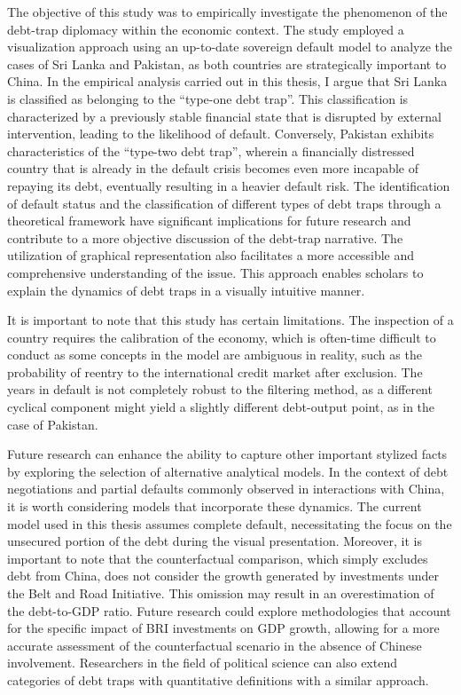 The objective of this study was to empirically investigate the phenomenon of the debt-trap diplomacy within the economic context. The study employed a visualization approach using an up-to-date sovereign default model to analyze the cases of Sri Lanka and Pakistan, as both countries are strategically important to China.
In the empirical analysis carried out in this thesis, I argue that Sri Lanka is classified as belonging to the ``type-one debt trap''. This classification is characterized by a previously stable financial state that is disrupted by external intervention, leading to the likelihood of default. Conversely, Pakistan exhibits characteristics of the ``type-two debt trap'', wherein a financially distressed country that is already in the default crisis becomes even more incapable of repaying its debt, eventually resulting in a heavier default risk.
The identification of default status and the classification of different types of debt traps through a theoretical framework have significant implications for future research and contribute to a more objective discussion of the debt-trap narrative. The utilization of graphical representation also facilitates a more accessible and comprehensive understanding of the issue. This approach enables scholars to explain the dynamics of debt traps in a visually intuitive manner.

It is important to note that this study has certain limitations. The inspection of a country requires the calibration of the economy, which is often-time difficult to conduct as some concepts in the model are ambiguous in reality, such as the probability of reentry to the international credit market after exclusion. The years in default is not completely robust to the filtering method, as a different cyclical component might yield a slightly different debt-output point, as in the case of Pakistan.

Future research can enhance the ability to capture other important stylized facts by exploring the selection of alternative analytical models. In the context of debt negotiations and partial defaults commonly observed in interactions with China, it is worth considering models that incorporate these dynamics. The current model used in this thesis assumes complete default, necessitating the focus on the unsecured portion of the debt during the visual presentation.
Moreover, it is important to note that the counterfactual comparison, which simply excludes debt from China, does not consider the growth generated by investments under the Belt and Road Initiative. This omission may result in an overestimation of the debt-to-GDP ratio. Future research could explore methodologies that account for the specific impact of BRI investments on GDP growth, allowing for a more accurate assessment of the counterfactual scenario in the absence of Chinese involvement. Researchers in the field of political science can also extend categories of debt traps with quantitative definitions with a similar approach.